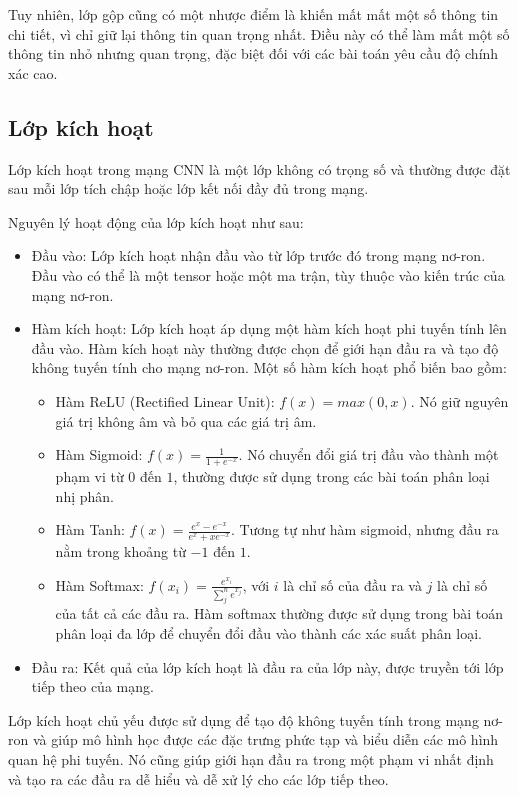 Tuy nhiên, lớp gộp cũng có một nhược điểm là khiến mất mất một số thông tin chi tiết, vì chỉ giữ lại thông tin quan trọng nhất. Điều này có thể làm mất một số thông tin nhỏ nhưng quan trọng, đặc biệt đối với các bài toán yêu cầu độ chính xác cao.

\subsection{Lớp kích hoạt}
Lớp kích hoạt trong mạng CNN là một lớp không có trọng số và thường được đặt sau mỗi lớp tích chập hoặc lớp kết nối đầy đủ trong mạng.

Nguyên lý hoạt động của lớp kích hoạt như sau:

\begin{itemize}
    \item Đầu vào: Lớp kích hoạt nhận đầu vào từ lớp trước đó trong mạng nơ-ron. Đầu vào có thể là một tensor hoặc một ma trận, tùy thuộc vào kiến trúc của mạng nơ-ron.
    \item Hàm kích hoạt: Lớp kích hoạt áp dụng một hàm kích hoạt phi tuyến tính lên đầu vào. Hàm kích hoạt này thường được chọn để giới hạn đầu ra và tạo độ không tuyến tính cho mạng nơ-ron. Một số hàm kích hoạt phổ biến bao gồm:
    \begin{itemize}
        \item Hàm ReLU (Rectified Linear Unit): $f(x) = max(0, x)$. Nó giữ nguyên giá trị không âm và bỏ qua các giá trị âm.
        \item Hàm Sigmoid: $f(x) = \frac{1}{1 + e^{-x}}$. Nó chuyển đổi giá trị đầu vào thành một phạm vi từ $0$ đến $1$, thường được sử dụng trong các bài toán phân loại nhị phân.
        \item Hàm Tanh: $f(x) = \frac{e^x - e^{-x}}{e^x +x e^{-x}}$. Tương tự như hàm sigmoid, nhưng đầu ra nằm trong khoảng từ $-1$ đến $1$.
        \item Hàm Softmax: $f(x_i) = \frac{e^{x_i}}{\sum^n_j e^{x_j}}$, với $i$ là chỉ số của đầu ra và $j$ là chỉ số của tất cả các đầu ra. Hàm softmax thường được sử dụng trong bài toán phân loại đa lớp để chuyển đổi đầu vào thành các xác suất phân loại.
    
    \end{itemize}
    \item Đầu ra: Kết quả của lớp kích hoạt là đầu ra của lớp này, được truyền tới lớp tiếp theo của mạng.
\end{itemize}
    
Lớp kích hoạt chủ yếu được sử dụng để tạo độ không tuyến tính trong mạng nơ-ron và giúp mô hình học được các đặc trưng phức tạp và biểu diễn các mô hình quan hệ phi tuyến. Nó cũng giúp giới hạn đầu ra trong một phạm vi nhất định và tạo ra các đầu ra dễ hiểu và dễ xử lý cho các lớp tiếp theo.

